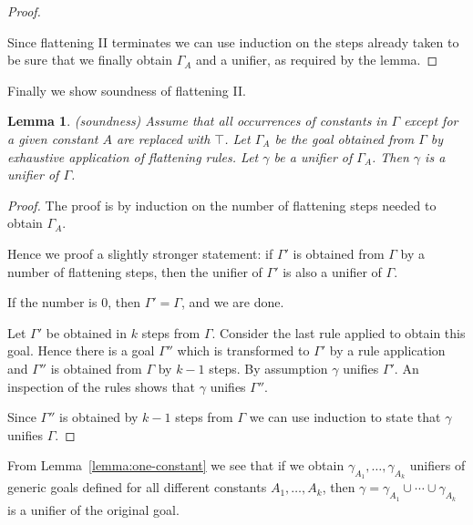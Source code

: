 \documentclass{article}
\newtheorem{lemma}{Lemma}
\begin{document}
\begin{proof}
\begin{enumerate}
\end{enumerate}

Since flattening II terminates we can use induction on the steps already taken to be sure that
we finally obtain $\Gamma_A$ and a unifier, as required by the lemma.
\end{proof}

Finally we show soundness of flattening II.

\begin{lemma}(soundness) \label{lemma:fltwosoundness}
	Assume that all occurrences of constants in $\Gamma$ except for a given constant $A$ are replaced with $\top$.
	Let $\Gamma_{A}$ be the goal obtained from $\Gamma$ by exhaustive application of  flattening rules.
	Let $\gamma$ be a unifier of $\Gamma_A$. Then $\gamma$ is a unifier of $\Gamma$.	
\end{lemma}

\begin{proof}
	The proof is by induction on the number of flattening steps needed to obtain $\Gamma_{A}$.
	
	Hence we proof a slightly stronger statement: if $\Gamma'$ is obtained from $\Gamma$ by a number of flattening steps,
	then the unifier of $\Gamma'$ is also a unifier of $\Gamma$.
	
	If the number is $0$, then $\Gamma'=\Gamma$, and we are done.
	
	Let $\Gamma'$ be obtained in $k$ steps from $\Gamma$.
	Consider the last rule applied to obtain this goal. Hence there is a goal $\Gamma''$ which is 
	transformed to $\Gamma'$ by a rule application and $\Gamma''$ is obtained from $\Gamma$ by $k-1$ steps. By assumption $\gamma$ unifies $\Gamma'$. An inspection of the rules shows that
	$\gamma$ unifies $\Gamma''$. 
	
	Since $\Gamma''$ is obtained by $k-1$ steps from $\Gamma$ we can use  induction to state that $\gamma$ unifies $\Gamma$.
\end{proof}

From Lemma~\ref{lemma:one-constant} we see that if we obtain $\gamma_{A_1}, \dots, \gamma_{A_k}$ unifiers of generic goals defined for all
different constants $A_1, \dots, A_k$, then $\gamma = \gamma_{A_1} \cup \cdots \cup \gamma_{A_k}$ is a unifier of the original goal.
\end{document}
